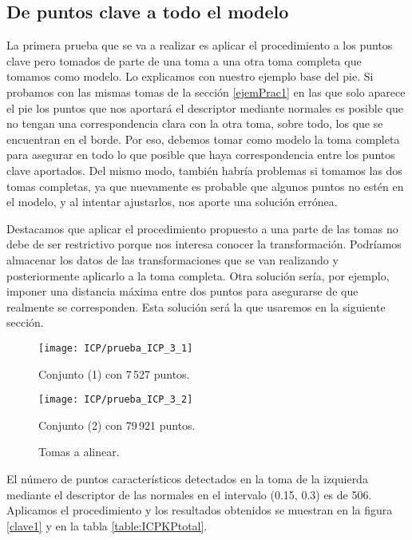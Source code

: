 \subsection{De puntos clave a todo el modelo}
La primera prueba que se va a realizar es aplicar el procedimiento a los puntos clave pero tomados de parte de una toma a una otra toma completa que tomamos como modelo. Lo explicamos con nuestro ejemplo base del pie. Si probamos con las mismas tomas de la sección \ref{ejemPrac1} en las que solo aparece el pie los puntos que nos aportará el descriptor mediante normales es posible que no tengan una correspondencia clara con la otra toma, sobre todo, los que se encuentran en el borde. Por eso, debemos tomar como modelo la toma completa para asegurar en todo lo que posible que haya correspondencia entre los puntos clave aportados. Del mismo modo, también habría problemas si tomamos las dos tomas completas, ya que nuevamente es probable que algunos puntos no estén en el modelo, y al intentar ajustarlos, nos aporte una solución errónea. \begin{comment}
Sección sola de aproximaciones erróneas
\end{comment} 
Destacamos que aplicar el procedimiento propuesto a una parte de las tomas no debe de ser restrictivo porque nos interesa conocer la transformación. Podríamos almacenar los datos de las transformaciones que se van realizando y posteriormente aplicarlo a la toma completa. Otra solución sería, por ejemplo, imponer una distancia máxima entre dos puntos para asegurarse de que realmente se corresponden. Esta solución será la que usaremos en la siguiente sección.\\

\begin{figure}[h!]

	\begin{minipage}[b]{0.5\textwidth}
		\centering
		\texttt{[image: ICP/prueba\_ICP\_3\_1]} 
		\caption*{Conjunto (1) con  7\,527 puntos.}
	\end{minipage}
	\begin{minipage}[b]{0.5\textwidth}
		\centering
		\texttt{[image: ICP/prueba\_ICP\_3\_2]}
		\caption*{Conjunto (2) con 79\,921 puntos.}
	\end{minipage}
	
	\caption{Tomas a alinear.}
\end{figure}

El número de puntos característicos detectados en la toma de la izquierda mediante el descriptor de las normales en el intervalo (0.15, 0.3) es de 506. Aplicamos el procedimiento y los resultados obtenidos se muestran en la figura \ref{clave1} y en la tabla \ref{table:ICPKPtotal}.\\

